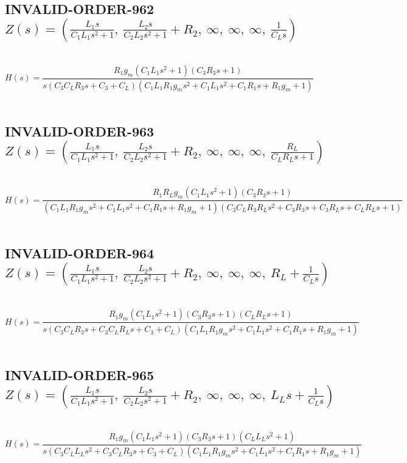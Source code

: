 \documentclass{article}
\begin{document}
\subsection{INVALID-ORDER-962 $Z(s) = \left( \frac{L_{1} s}{C_{1} L_{1} s^{2} + 1}, \  \frac{L_{2} s}{C_{2} L_{2} s^{2} + 1} + R_{2}, \  \infty, \  \infty, \  \infty, \  \frac{1}{C_{L} s}\right)$ } \ 
\textbf{\[H(s) = \frac{R_{1} g_{m} \left(C_{1} L_{1} s^{2} + 1\right) \left(C_{3} R_{3} s + 1\right)}{s \left(C_{3} C_{L} R_{3} s + C_{3} + C_{L}\right) \left(C_{1} L_{1} R_{1} g_{m} s^{2} + C_{1} L_{1} s^{2} + C_{1} R_{1} s + R_{1} g_{m} + 1\right)}\] } \ 
\subsection{INVALID-ORDER-963 $Z(s) = \left( \frac{L_{1} s}{C_{1} L_{1} s^{2} + 1}, \  \frac{L_{2} s}{C_{2} L_{2} s^{2} + 1} + R_{2}, \  \infty, \  \infty, \  \infty, \  \frac{R_{L}}{C_{L} R_{L} s + 1}\right)$ } \ 
\textbf{\[H(s) = \frac{R_{1} R_{L} g_{m} \left(C_{1} L_{1} s^{2} + 1\right) \left(C_{3} R_{3} s + 1\right)}{\left(C_{1} L_{1} R_{1} g_{m} s^{2} + C_{1} L_{1} s^{2} + C_{1} R_{1} s + R_{1} g_{m} + 1\right) \left(C_{3} C_{L} R_{3} R_{L} s^{2} + C_{3} R_{3} s + C_{3} R_{L} s + C_{L} R_{L} s + 1\right)}\] } \ 
\subsection{INVALID-ORDER-964 $Z(s) = \left( \frac{L_{1} s}{C_{1} L_{1} s^{2} + 1}, \  \frac{L_{2} s}{C_{2} L_{2} s^{2} + 1} + R_{2}, \  \infty, \  \infty, \  \infty, \  R_{L} + \frac{1}{C_{L} s}\right)$ } \ 
\textbf{\[H(s) = \frac{R_{1} g_{m} \left(C_{1} L_{1} s^{2} + 1\right) \left(C_{3} R_{3} s + 1\right) \left(C_{L} R_{L} s + 1\right)}{s \left(C_{3} C_{L} R_{3} s + C_{3} C_{L} R_{L} s + C_{3} + C_{L}\right) \left(C_{1} L_{1} R_{1} g_{m} s^{2} + C_{1} L_{1} s^{2} + C_{1} R_{1} s + R_{1} g_{m} + 1\right)}\] } \ 
\subsection{INVALID-ORDER-965 $Z(s) = \left( \frac{L_{1} s}{C_{1} L_{1} s^{2} + 1}, \  \frac{L_{2} s}{C_{2} L_{2} s^{2} + 1} + R_{2}, \  \infty, \  \infty, \  \infty, \  L_{L} s + \frac{1}{C_{L} s}\right)$ } \ 
\textbf{\[H(s) = \frac{R_{1} g_{m} \left(C_{1} L_{1} s^{2} + 1\right) \left(C_{3} R_{3} s + 1\right) \left(C_{L} L_{L} s^{2} + 1\right)}{s \left(C_{3} C_{L} L_{L} s^{2} + C_{3} C_{L} R_{3} s + C_{3} + C_{L}\right) \left(C_{1} L_{1} R_{1} g_{m} s^{2} + C_{1} L_{1} s^{2} + C_{1} R_{1} s + R_{1} g_{m} + 1\right)}\] } \ 
\end{document}
